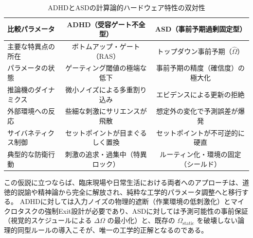 \begin{table}[htbp]
\centering
\caption{ADHDとASDの計算論的ハードウェア特性の双対性}
\label{tab:adhd_asd_duality}
\begin{tabular}{lcc}
\toprule
\textbf{比較パラメータ} & \textbf{ADHD（受容ゲート不全型）} & \textbf{ASD（事前予期過剰固定型）} \\
\midrule
主要な特異点の所在 & ボトムアップ・ゲート（RAS） & トップダウン事前予期（$\hat{\Omega}$） \\
パラメータの状態 & ゲーティング閾値の極端な低下 & 事前予期の精度（確信度）の極大化 \\
推論機のダイナミクス & 微小ノイズによる多重割り込み & エビデンスによる更新の拒絶 \\
外部環境への反応 & 些細な刺激にサリエンスが飛散 & 想定外の変化で予測誤差が爆発 \\
サイバネティクス制御 & セットポイントが目まぐるしく置換 & セットポイントが不可逆的に硬直 \\
典型的な防衛行動 & 刺激の追求・過集中（特異ロック） & ルーティン化・環境の固定（シールド） \\
\bottomrule
\end{tabular}
\end{table}

この仮説に立つならば、臨床現場や日常生活における両者へのアプローチは、道徳的説諭や精神論から完全に解放され、純粋な工学的パラメータ調整へと移行する。
ADHDに対しては入力ノイズの物理的遮断（作業環境の低刺激化）とマイクロタスクの強制Exit設計が必要であり、ASDに対しては予測可能性の事前保証（視覚的スケジュールによる $\Delta \Omega$ の最小化）と、既存の $\Omega_{\mathrm{static}}$ を破壊しない論理的同型ルールの導入こそが、唯一の工学的正解となるのである。


